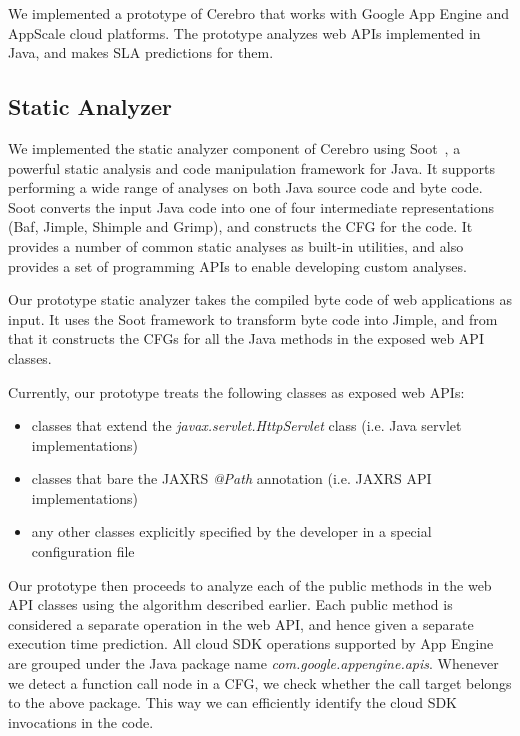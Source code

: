 We implemented a prototype of Cerebro that works with Google App Engine and AppScale cloud platforms.
The prototype analyzes web APIs implemented in Java, and makes SLA predictions for them.

\subsection{Static Analyzer}
We implemented the static analyzer component of Cerebro using 
Soot~\cite{Vallee-Rai:2010:SJB:1925805.1925818}, a powerful
static analysis and code manipulation framework for Java. It supports performing a wide range of analyses on both Java source
code and byte code. Soot converts the input Java code into one of four intermediate representations (Baf, Jimple,
 Shimple and Grimp), and constructs the CFG for the code. It provides a number of common static
 analyses as built-in utilities, and also provides a set of programming APIs to enable developing custom
 analyses.
 
Our prototype static analyzer takes the compiled byte code of web applications as input. It uses the
Soot framework to transform byte code into Jimple, and from that it constructs the CFGs for 
all the Java methods in the exposed web API classes. 

Currently, our
prototype treats the following classes as exposed web APIs:

\begin{itemize}
\item classes that extend the \textit{javax.servlet.HttpServlet} class (i.e. Java servlet implementations)
\item classes that bare the JAXRS \textit{@Path} annotation (i.e. JAXRS API implementations)
\item any other classes explicitly specified by the developer in a special configuration file
\end{itemize}
 
Our prototype then proceeds to analyze each of the public methods in the web API classes
using the algorithm described earlier. Each public method is considered a separate operation
in the web API, and hence given a separate execution time prediction.
All cloud SDK operations supported by App Engine
are grouped under the Java package name \textit{com.google.appengine.apis}. Whenever we detect
a function call node in a CFG, we check whether the call target belongs to the above package.
This way we can efficiently identify the cloud SDK invocations in the code.

